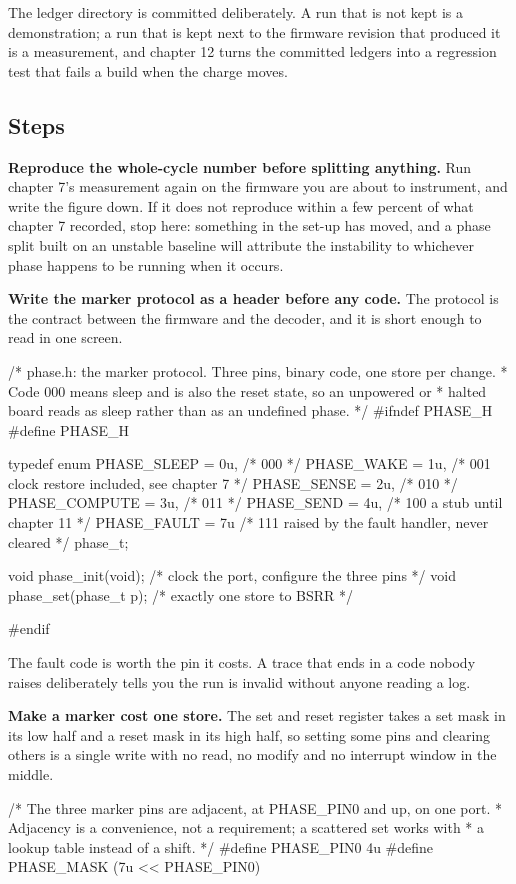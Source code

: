 The ledger directory is committed deliberately. A run that is not kept is a
demonstration; a run that is kept next to the firmware revision that produced it
is a measurement, and chapter 12 turns the committed ledgers into a regression
test that fails a build when the charge moves.

\subsection*{Steps}

\begin{steps}
\item \textbf{Reproduce the whole-cycle number before splitting anything.} Run
chapter 7's measurement again on the firmware you are about to instrument, and
write the figure down. If it does not reproduce within a few percent of what
chapter 7 recorded, stop here: something in the set-up has moved, and a phase
split built on an unstable baseline will attribute the instability to whichever
phase happens to be running when it occurs.

\item \textbf{Write the marker protocol as a header before any code.} The
protocol is the contract between the firmware and the decoder, and it is short
enough to read in one screen.
\begin{ccode}
/* phase.h: the marker protocol. Three pins, binary code, one store per change.
 * Code 000 means sleep and is also the reset state, so an unpowered or
 * halted board reads as sleep rather than as an undefined phase.          */
#ifndef PHASE_H
#define PHASE_H

typedef enum {
    PHASE_SLEEP   = 0u,   /* 000 */
    PHASE_WAKE    = 1u,   /* 001  clock restore included, see chapter 7 */
    PHASE_SENSE   = 2u,   /* 010 */
    PHASE_COMPUTE = 3u,   /* 011 */
    PHASE_SEND    = 4u,   /* 100  a stub until chapter 11 */
    PHASE_FAULT   = 7u    /* 111  raised by the fault handler, never cleared */
} phase_t;

void phase_init(void);           /* clock the port, configure the three pins */
void phase_set(phase_t p);       /* exactly one store to BSRR                */

#endif
\end{ccode}
The fault code is worth the pin it costs. A trace that ends in a code nobody
raises deliberately tells you the run is invalid without anyone reading a log.

\item \textbf{Make a marker cost one store.} The set and reset register takes a
set mask in its low half and a reset mask in its high half, so setting some pins
and clearing others is a single write with no read, no modify and no interrupt
window in the middle.
\begin{ccode}
/* The three marker pins are adjacent, at PHASE_PIN0 and up, on one port.
 * Adjacency is a convenience, not a requirement; a scattered set works with
 * a lookup table instead of a shift.                                      */
#define PHASE_PIN0   4u
#define PHASE_MASK   (7u << PHASE_PIN0)


\end{ccode}
\end{steps}
